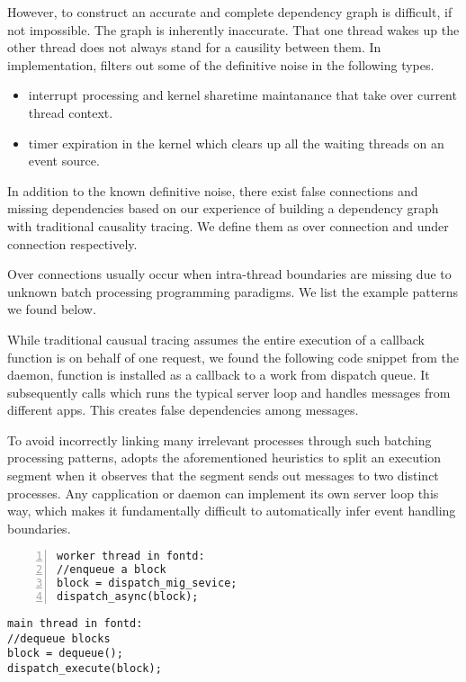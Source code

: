 However, to construct an accurate and complete dependency graph is difficult,
if not impossible. The graph is inherently inaccurate. That one thread wakes
up the other thread does not always stand for a causility between them. In
implementation, \xxx filters out some of the definitive noise in the following
types.

\begin{itemize}

\item interrupt processing and kernel sharetime maintanance that take over
current thread context.

\item timer expiration in the kernel which clears up all the waiting threads on
an event source.

\end{itemize}

In addition to the known definitive noise, there exist false connections and
missing dependencies based on our experience of building a dependency graph
with traditional causality tracing. We define them as over connection and under
connection respectively.

Over connections usually occur when intra-thread boundaries are missing due to
unknown batch processing programming paradigms. We list the example patterns we
found below.

While traditional causual tracing assumes the entire execution of a
callback function is on behalf of one request, we found the following code
snippet from the  daemon, function  is
installed as a callback to a work from dispatch queue. It subsequently calls
 which runs the typical server loop and handles
messages from different apps. This creates false dependencies among messages.

To avoid incorrectly linking many irrelevant processes through such batching
processing patterns, \xxx adopts the aforementioned heuristics to split an
execution segment when it observes that the segment sends out messages to two
distinct processes. Any capplication or daemon can implement its own server loop
this way, which makes it fundamentally difficult to automatically infer event
handling boundaries.

{\footnotesize\begin{BVerbatim}[baseline=c,numbers=left]
worker thread in fontd:
//enqueue a block
block = dispatch_mig_sevice;
dispatch_async(block);
\end{BVerbatim}
}
\quad
{\footnotesize\begin{BVerbatim}[baseline=c]
main thread in fontd:
//dequeue blocks
block = dequeue();
dispatch_execute(block);
\end{BVerbatim}
}
	
